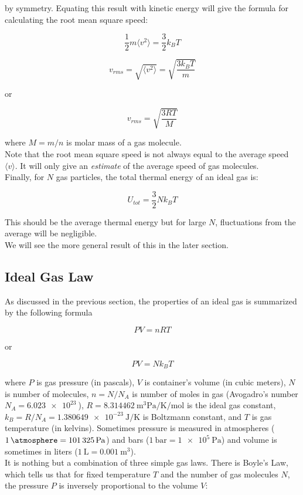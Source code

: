 by symmetry. Equating this result with kinetic energy will give the formula for calculating the root mean square speed:

$$\frac12m\langle v^2 \rangle=\frac32k_BT$$

$$v_{rms}=\sqrt{\langle v^2 \rangle}=\sqrt{\frac{3k_BT}{m}}$$

or

$$v_{rms}=\sqrt{\frac{3RT}{M}}$$

where $M=m/n$ is molar mass of a gas molecule. \\

Note that the root mean square speed is not always equal to the average speed $\langle v \rangle$. It will only give an \textit{estimate} of the average speed of gas molecules. \\

Finally, for $N$ gas particles, the total thermal energy of an ideal gas is:

$$\boxed{U_{tot}=\frac32Nk_BT}$$

This should be the average thermal energy but for large $N$, fluctuations from the average will be negligible. \\

We will see the more general result of this in the later section.

\subsection{Ideal Gas Law}

As discussed in the previous section, the properties of an ideal gas is summarized by the following formula

\[ PV=nRT \]

or

\[ PV=Nk_BT \]

where $P$ is gas pressure (in pascals), $V$ is container's volume (in cubic meters), $N$ is number of molecules, $n=N/N_A$ is number of moles in gas (Avogadro's number $N_A=\SI{6.023e23}{}$), $R=\SI{8.314462}{\cubic\meter\pascal\per\kelvin\per\mole}$ is the ideal gas constant, $k_B=R/N_A=\SI{1.380649e-23}{\joule\per\kelvin}$ is Boltzmann constant, and $T$ is gas temperature (in kelvins). Sometimes pressure is measured in atmospheres ($\SI{1}{\atmosphere}=\SI{101325}{\pascal}$) and bars ($\SI{1}{\bar}=\SI{1e5}{\pascal}$) and volume is sometimes in liters ($\SI{1}{\liter}=\SI{0.001}{\cubic\meter}$). \\

It is nothing but a combination of three simple gas laws. There is Boyle's Law, which tells us that for fixed temperature $T$ and the number of gas molecules $N$, the pressure $P$ is inversely proportional to the volume $V$:

